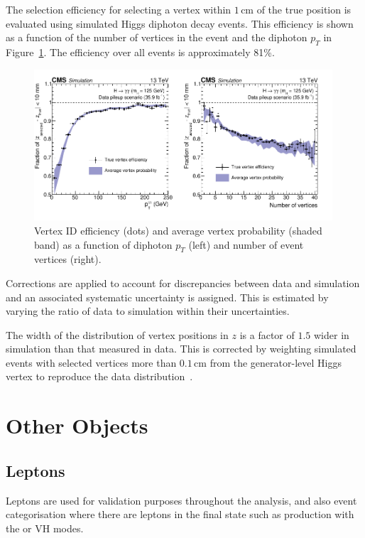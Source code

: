 The selection efficiency for selecting a vertex within $1$\,cm of the true position is evaluated using simulated Higgs diphoton decay events. This efficiency is shown as a function of the number of vertices in the event and the diphoton $p_{T}$ in Figure~\ref{fig:object_reco:vertex_id_efficiency}. The efficiency over all events is approximately 81\%.
\begin{figure}[h!]
    \centering
    \includegraphics[width=0.99\textwidth]{figures/object_reco/CMS-HIG-16-040_Figure_004.pdf}
    \caption{Vertex ID efficiency (dots) and average vertex probability (shaded band) as a function of diphoton $p_T$ (left) and number of event vertices (right).}
        \label{fig:object_reco:vertex_id_efficiency}
\end{figure}

Corrections are applied to account for discrepancies between data and simulation and an associated systematic uncertainty is assigned. This is estimated by varying the ratio of data to simulation within their uncertainties. 

The width of the distribution of vertex positions in $z$ is a factor of $1.5$ wider in simulation than that measured in data. 
This is corrected by weighting simulated events with selected vertices more than $0.1$\,cm from the generator-level Higgs vertex to reproduce the data distribution~\cite{HIG-16-040}.




\section{Other Objects}

\subsection{Leptons}
Leptons are used for validation purposes throughout the analysis, and also event categorisation where there are leptons in the final state such as production with the \ttH or VH modes. 
